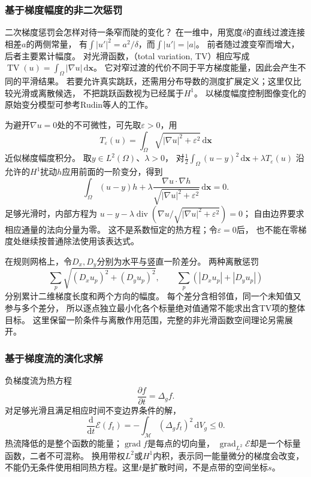 \subsubsection{基于梯度幅度的非二次惩罚}
\label{sec:functional-total-variation-comparison}

二次梯度惩罚会怎样对待一条窄而陡的变化？
在一维中，用宽度$\delta$的直线过渡连接相差$a$的两侧常量，
有$\int|u'|^2=a^2/\delta$，而$\int|u'|=|a|$。
前者随过渡变窄而增大，后者主要累计幅度。
对光滑函数，（total variation, TV）相应写成
$\operatorname{TV}(u)=\int_\Omega|\nabla u|\,\mathrm d\bm x$。
它对窄过渡的代价不同于平方梯度能量，因此会产生不同的平滑结果。
若要允许真实跳跃，还需用分布导数的测度扩展定义；这里仅比较光滑或离散候选，
不把跳跃函数视为已经属于$H^1$。
以梯度幅度控制图像变化的原始变分模型可参考Rudin等人的工作。

为避开$\nabla u=0$处的不可微性，可先取$\varepsilon>0$，用
\[
 T_\varepsilon(u)=\int_\Omega\sqrt{|\nabla u|^2+\varepsilon^2}\,\mathrm d\bm x
\]
近似梯度幅度积分。
取$y\in L^2(\Omega)$、$\lambda>0$，
对$\tfrac12\int_\Omega(u-y)^2\,\mathrm d\bm x+\lambda T_\varepsilon(u)$
沿允许的$H^1$扰动$h$应用前面的一阶变分，得到
\[
 \int_\Omega(u-y)h
 +\lambda\frac{\nabla u\cdot\nabla h}
 {\sqrt{|\nabla u|^2+\varepsilon^2}}\,\mathrm d\bm x=0.
\]
足够光滑时，内部方程为
$u-y-\lambda\operatorname{div}(\nabla u/\sqrt{|\nabla u|^2+\varepsilon^2})=0$；
自由边界要求相应通量的法向分量为零。
这不是系数恒定的热方程；令$\varepsilon=0$后，
也不能在零梯度处继续按普通除法使用该表达式。

在规则网格上，令$D_x,D_y$分别为水平与竖直一阶差分。
两种离散惩罚
\[
 \sum_p\sqrt{(D_xu_p)^2+(D_yu_p)^2},\qquad
 \sum_p(|D_xu_p|+|D_yu_p|)
\]
分别累计二维梯度长度和两个方向的幅度。
每个差分含相邻值，同一个未知值又参与多个差分，
所以逐点独立最小化各个标量绝对值通常不能求出含TV项的整体目标。
这里保留一阶条件与离散作用范围，完整的非光滑函数空间理论另需展开。

\subsubsection{基于梯度流的演化求解}
\label{sec:functional-gradient-flow-solvers}

负梯度流为热方程
\begin{equation}
 \frac{\partial f}{\partial t}=\Delta_gf.
 \label{eq:geometry-heat-equation}
\end{equation}
对足够光滑且满足相应时间不变边界条件的解，
\[
 \frac{\mathrm d}{\mathrm dt}\mathcal E(f_t)
 =-\int_{\mathcal M}(\Delta_gf_t)^2\,\mathrm dV_g\leq0.
\]
热流降低的是整个函数的能量；$\operatorname{grad}f$是每点的切向量，
$\operatorname{grad}_{L^2}\mathcal E$却是一个标量函数，二者不可混称。
换用带权$L^2$或$H^1$内积，表示同一能量微分的梯度会改变，
不能仍无条件使用相同热方程。这里$t$是扩散时间，不是点带的空间坐标$s$。



